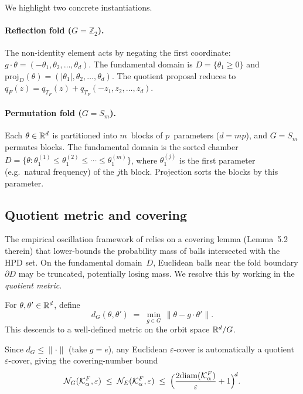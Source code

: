 \medskip
\noindent
We highlight two concrete instantiations.

\paragraph{Reflection fold ($G = \mathbb{Z}_2$).}
The non-identity element acts by negating the first coordinate:
$g \cdot \theta = (-\theta_1, \theta_2, \ldots, \theta_d)$.
The fundamental domain is $D = \{\theta_1 \geq 0\}$ and
$\mathrm{proj}_D(\theta) = (|\theta_1|, \theta_2, \ldots, \theta_d)$.
The quotient proposal reduces to
$q_F(z) = q_{T_F}(z) + q_{T_F}(-z_1, z_2, \ldots, z_d)$.

\paragraph{Permutation fold ($G = S_m$).}
Each $\theta \in \mathbb{R}^d$ is partitioned into $m$~blocks of $p$~parameters
($d = mp$), and $G = S_m$ permutes blocks.
The fundamental domain is the sorted chamber
$D = \{\theta : \theta^{(1)}_1 \leq \theta^{(2)}_1 \leq \cdots
\leq \theta^{(m)}_1\}$, where $\theta^{(j)}_1$ is the first parameter
(e.g.\ natural frequency) of the $j$th block.
Projection sorts the blocks by this parameter.


\subsection{Quotient metric and covering}
\label{sec:quotient_metric}

The empirical oscillation framework of \citet{LCNF} relies on a covering
lemma (Lemma~5.2 therein) that lower-bounds the probability mass
of balls intersected with the HPD set.  On the fundamental domain~$D$,
Euclidean balls near the fold boundary $\partial D$ may be truncated,
potentially losing mass.  We resolve this by working in the
\emph{quotient metric}.

\begin{definition}\label{def:quotient_metric}
  For $\theta, \theta' \in \mathbb{R}^d$, define
  \begin{equation}\label{eq:d_G}
    d_G(\theta, \theta')
    \;=\; \min_{g \in G}\, \|\theta - g \cdot \theta'\|.
  \end{equation}
  This descends to a well-defined metric on the orbit space $\mathbb{R}^d/G$.
\end{definition}

\noindent
Since $d_G \leq \|\cdot\|$ (take $g = e$), any Euclidean
$\varepsilon$-cover is automatically a quotient $\varepsilon$-cover,
giving the covering-number bound
\begin{equation}\label{eq:covering_number}
  \mathcal{N}_G(\mathcal{K}_\alpha^F, \varepsilon)
  \;\leq\;
  \mathcal{N}_E(\mathcal{K}_\alpha^F, \varepsilon)
  \;\leq\;
  \Bigl(\frac{2\mathrm{diam}(\mathcal{K}_\alpha^F)}{\varepsilon} + 1\Bigr)^{\!d}.
\end{equation}

